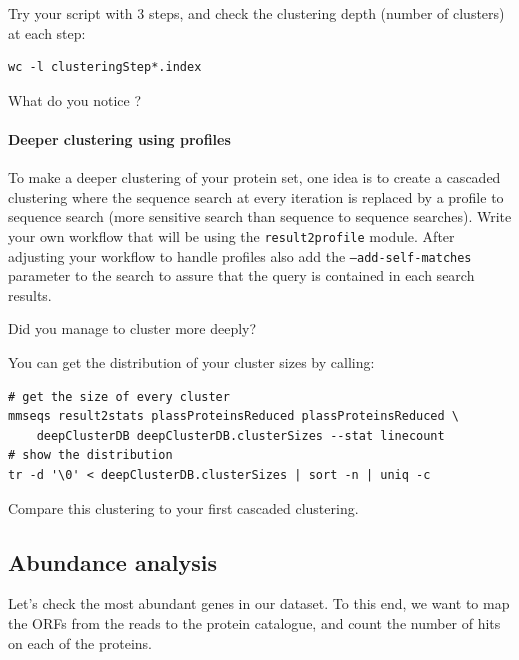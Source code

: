 \documentclass{scrartcl}
\begin{document}
Try your script with 3 steps, and check the clustering depth (number of clusters) at each step:
\begin{verbatim}
wc -l clusteringStep*.index
\end{verbatim}

What do you notice ?

\paragraph{Deeper clustering using profiles}
To make a deeper clustering of your protein set, one idea is to create a cascaded clustering where the sequence search at every iteration is replaced by a profile to sequence search (more sensitive search than sequence to sequence searches). Write your own workflow that will be using the \texttt{result2profile} module. After adjusting your workflow to handle profiles also add the \texttt{--add-self-matches} parameter to the search to assure that the query is contained in each search results.

Did you manage to cluster more deeply?

You can get the distribution of your cluster sizes by calling:

\begin{verbatim}
# get the size of every cluster
mmseqs result2stats plassProteinsReduced plassProteinsReduced \
    deepClusterDB deepClusterDB.clusterSizes --stat linecount
# show the distribution
tr -d '\0' < deepClusterDB.clusterSizes | sort -n | uniq -c
\end{verbatim}

Compare this clustering to your first cascaded clustering.

\subsection{Abundance analysis}
Let's check the most abundant genes in our dataset. To this end, we want to map the ORFs from the reads to the protein catalogue, and count the number of hits on each of the proteins.
\end{document}
